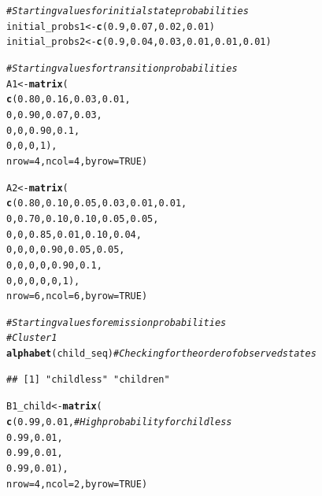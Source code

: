 \documentclass[12pt]{article}\usepackage[]{graphicx}\usepackage[]{color}
\makeatletter
\newcommand{\hlnum}[1]{\textcolor[rgb]{0.686,0.059,0.569}{#1}}%
\newcommand{\hlcom}[1]{\textcolor[rgb]{0.678,0.584,0.686}{\textit{#1}}}%
\newcommand{\hlstd}[1]{\textcolor[rgb]{0.345,0.345,0.345}{#1}}%
\newcommand{\hlkwb}[1]{\textcolor[rgb]{0.69,0.353,0.396}{#1}}%
\newcommand{\hlkwc}[1]{\textcolor[rgb]{0.333,0.667,0.333}{#1}}%
\newcommand{\hlkwd}[1]{\textcolor[rgb]{0.737,0.353,0.396}{\textbf{#1}}}%
\newenvironment{kframe}{%
 \def\at@end@of@kframe{}%
 \ifinner\ifhmode%
  \def\at@end@of@kframe{\end{minipage}}%
  \begin{minipage}{\columnwidth}%
 \fi\fi%
 \def\FrameCommand##1{\hskip\@totalleftmargin \hskip-\fboxsep
 \colorbox{shadecolor}{##1}\hskip-\fboxsep
     \hskip-\linewidth \hskip-\@totalleftmargin \hskip\columnwidth}%
 \MakeFramed {\advance\hsize-\width
   \@totalleftmargin\z@ \linewidth\hsize
   \@setminipage}}%
 {\par\unskip\endMakeFramed%
 \at@end@of@kframe}
\newenvironment{knitrout}{}{} %
\makeatother
\begin{document}
\begin{knitrout}
\color{fgcolor}\begin{kframe}
\begin{alltt}
\hlcom{# Starting values for initial state probabilities}
\hlstd{initial_probs1} \hlkwb{<-} \hlkwd{c}\hlstd{(}\hlnum{0.9}\hlstd{,} \hlnum{0.07}\hlstd{,} \hlnum{0.02}\hlstd{,} \hlnum{0.01}\hlstd{)}
\hlstd{initial_probs2} \hlkwb{<-} \hlkwd{c}\hlstd{(}\hlnum{0.9}\hlstd{,} \hlnum{0.04}\hlstd{,} \hlnum{0.03}\hlstd{,} \hlnum{0.01}\hlstd{,} \hlnum{0.01}\hlstd{,} \hlnum{0.01}\hlstd{)}

\hlcom{# Starting values for transition probabilities}
\hlstd{A1} \hlkwb{<-} \hlkwd{matrix}\hlstd{(}
  \hlkwd{c}\hlstd{(}\hlnum{0.80}\hlstd{,} \hlnum{0.16}\hlstd{,} \hlnum{0.03}\hlstd{,} \hlnum{0.01}\hlstd{,}
       \hlnum{0}\hlstd{,} \hlnum{0.90}\hlstd{,} \hlnum{0.07}\hlstd{,} \hlnum{0.03}\hlstd{,}
       \hlnum{0}\hlstd{,}    \hlnum{0}\hlstd{,} \hlnum{0.90}\hlstd{,}  \hlnum{0.1}\hlstd{,}
       \hlnum{0}\hlstd{,}    \hlnum{0}\hlstd{,}    \hlnum{0}\hlstd{,}    \hlnum{1}\hlstd{),}
  \hlkwc{nrow} \hlstd{=} \hlnum{4}\hlstd{,} \hlkwc{ncol} \hlstd{=} \hlnum{4}\hlstd{,} \hlkwc{byrow} \hlstd{=} \hlnum{TRUE}\hlstd{)}

\hlstd{A2} \hlkwb{<-} \hlkwd{matrix}\hlstd{(}
  \hlkwd{c}\hlstd{(}\hlnum{0.80}\hlstd{,} \hlnum{0.10}\hlstd{,} \hlnum{0.05}\hlstd{,} \hlnum{0.03}\hlstd{,} \hlnum{0.01}\hlstd{,} \hlnum{0.01}\hlstd{,}
       \hlnum{0}\hlstd{,} \hlnum{0.70}\hlstd{,} \hlnum{0.10}\hlstd{,} \hlnum{0.10}\hlstd{,} \hlnum{0.05}\hlstd{,} \hlnum{0.05}\hlstd{,}
       \hlnum{0}\hlstd{,}    \hlnum{0}\hlstd{,} \hlnum{0.85}\hlstd{,} \hlnum{0.01}\hlstd{,} \hlnum{0.10}\hlstd{,} \hlnum{0.04}\hlstd{,}
       \hlnum{0}\hlstd{,}    \hlnum{0}\hlstd{,}    \hlnum{0}\hlstd{,} \hlnum{0.90}\hlstd{,} \hlnum{0.05}\hlstd{,} \hlnum{0.05}\hlstd{,}
       \hlnum{0}\hlstd{,}    \hlnum{0}\hlstd{,}    \hlnum{0}\hlstd{,}    \hlnum{0}\hlstd{,} \hlnum{0.90}\hlstd{,}  \hlnum{0.1}\hlstd{,}
       \hlnum{0}\hlstd{,}    \hlnum{0}\hlstd{,}    \hlnum{0}\hlstd{,}    \hlnum{0}\hlstd{,}    \hlnum{0}\hlstd{,}    \hlnum{1}\hlstd{),}
  \hlkwc{nrow} \hlstd{=} \hlnum{6}\hlstd{,} \hlkwc{ncol} \hlstd{=} \hlnum{6}\hlstd{,} \hlkwc{byrow} \hlstd{=} \hlnum{TRUE}\hlstd{)}

\hlcom{# Starting values for emission probabilities}
\hlcom{# Cluster 1}
\hlkwd{alphabet}\hlstd{(child_seq)} \hlcom{# Checking for the order of observed states}
\end{alltt}
\begin{verbatim}
## [1] "childless" "children"
\end{verbatim}
\begin{alltt}
\hlstd{B1_child} \hlkwb{<-} \hlkwd{matrix}\hlstd{(}
  \hlkwd{c}\hlstd{(}\hlnum{0.99}\hlstd{,} \hlnum{0.01}\hlstd{,} \hlcom{# High probability for childless}
    \hlnum{0.99}\hlstd{,} \hlnum{0.01}\hlstd{,}
    \hlnum{0.99}\hlstd{,} \hlnum{0.01}\hlstd{,}
    \hlnum{0.99}\hlstd{,} \hlnum{0.01}\hlstd{),}
  \hlkwc{nrow} \hlstd{=} \hlnum{4}\hlstd{,} \hlkwc{ncol} \hlstd{=} \hlnum{2}\hlstd{,} \hlkwc{byrow} \hlstd{=} \hlnum{TRUE}\hlstd{)}


\end{alltt}
\end{kframe}
\end{knitrout}
\end{document}

